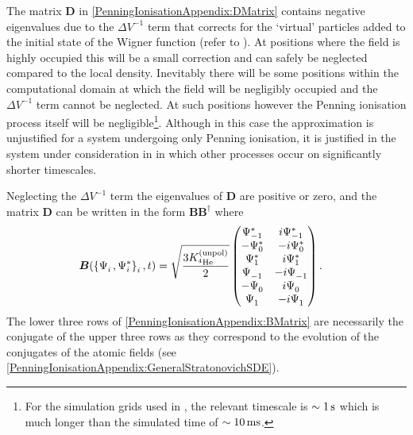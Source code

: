 The matrix $\bm{D}$ in \eqref{PenningIonisationAppendix:DMatrix} contains negative eigenvalues due to the $\Delta V^{-1}$ term that corrects for the `virtual' particles added to the initial state of the Wigner function (refer to ). At positions where the field is highly occupied this will be a small correction and can safely be neglected compared to the local density. Inevitably there will be some positions within the computational domain at which the field will be negligibly occupied and the $\Delta V^{-1}$ term cannot be neglected. At such positions however the Penning ionisation process itself will be negligible\footnote{For the simulation grids used in , the relevant timescale is $\sim \unit[1]{s}$ which is much longer than the simulated time of $\sim \unit[10]{ms}$.}. Although in this case the approximation is unjustified for a system undergoing only Penning ionisation, it is justified in the system under consideration in  in which other processes occur on significantly shorter timescales.

Neglecting the $\Delta V^{-1}$ term the eigenvalues of $\bm{D}$ are positive or zero, and the matrix $\bm{D}$ can be written in the form $\bm{B}\bm{B}^\dagger$ where
\begin{align}
    \bm{B}(\left\{\Psi_i^{\phantom{*}}, \Psi_i^*\right\}_i, t) &= \sqrt{\frac{3 \Kunpol}{2}}
    \begin{pmatrix}
        \Psi_{-1}^* & i \Psi_{-1}^* \\
        -\Psi_0^* & -i \Psi_0^* \\
        \Psi_1^* & i \Psi_1^* \\
        \Psi_{-1}^{\phantom{*}} & -i \Psi_{-1}^{\phantom{*}} \\
        -\Psi_0^{\phantom{*}} & i \Psi_0^{\phantom{*}} \\
        \Psi_{1}^{\phantom{*}} & -i \Psi_{1}^{\phantom{*}}
    \end{pmatrix}.
    \label{PenningIonisationAppendix:BMatrix}
\end{align}
The lower three rows of \eqref{PenningIonisationAppendix:BMatrix} are necessarily the conjugate of the upper three rows as they correspond to the evolution of the conjugates of the atomic fields (see \eqref{PenningIonisationAppendix:GeneralStratonovichSDE}).

